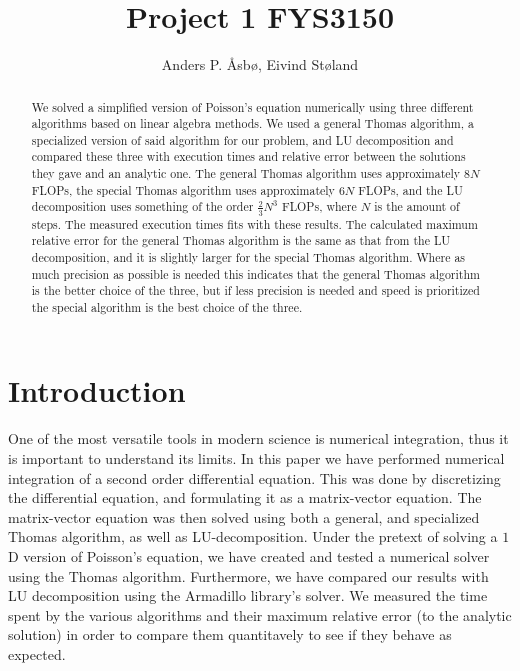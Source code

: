 \documentclass[english,notitlepage,reprint,nofootinbib]{revtex4-1}  %
\begin{document}
\title{Project 1 FYS3150}   %
\author{Anders P. Åsbø, Eivind Støland}               %

\noaffiliation                            %

\begin{abstract}
We solved a simplified version of Poisson's equation numerically using three different algorithms based on linear algebra methods. We used a general Thomas algorithm, a specialized version of said algorithm for our problem, and LU decomposition and compared these three with execution times and relative error between the solutions they gave and an analytic one. The general Thomas algorithm uses approximately $8N$ FLOPs, the special Thomas algorithm uses approximately $6N$ FLOPs, and the LU decomposition uses something of the order $\frac{2}{3}N^3$ FLOPs, where $N$ is the amount of steps. The measured execution times fits with these results. The calculated maximum relative error for the general Thomas algorithm is the same as that from the LU decomposition, and it is slightly larger for the special Thomas algorithm. Where as much precision as possible is needed this indicates that the general Thomas algorithm is the better choice of the three, but if less precision is needed and speed is prioritized the special algorithm is the best choice of the three. 
\end{abstract}
\maketitle



\tableofcontents


\section{Introduction} \label{sec:I}

One of the most versatile tools in modern science is numerical integration, thus it is important to understand its limits. In this paper we have performed numerical integration of a second order differential equation. This was done by discretizing the differential equation, and formulating it as a matrix-vector equation. The matrix-vector equation was then solved using both a general, and specialized Thomas algorithm, as well as LU-decomposition. Under the pretext of solving a \(1\)D version of Poisson's equation, we have created and tested a numerical solver using the Thomas algorithm. Furthermore, we have compared our results with LU decomposition using the Armadillo library's solver. We measured the time spent by the various algorithms and their maximum relative error (to the analytic solution) in order to compare them quantitavely to see if they behave as expected.
\end{document}
